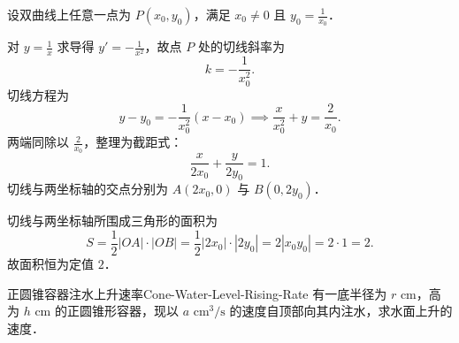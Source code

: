 \begin{myproof}
    设双曲线上任意一点为 $P(x_0, y_0)$，满足 $x_0 \neq 0$ 且 $y_0 = \frac{1}{x_0}$．

    \begin{center}
    \end{center}

    对 $y = \frac{1}{x}$ 求导得 $y' = -\frac{1}{x^2}$，故点 $P$ 处的切线斜率为
    \begin{equation}
        k = -\frac{1}{x_0^2}.
    \end{equation}
    切线方程为
    \begin{equation}
        y - y_0 = -\frac{1}{x_0^2}(x - x_0) \implies \frac{x}{x_0^2} + y = \frac{2}{x_0}.
    \end{equation}
    两端同除以 $\frac{2}{x_0}$，整理为截距式：
    \begin{equation}
        \frac{x}{2x_0} + \frac{y}{2y_0} = 1.
    \end{equation}
    切线与两坐标轴的交点分别为 $A(2x_0, 0)$ 与 $B(0, 2y_0)$．

    切线与两坐标轴所围成三角形的面积为
    \begin{equation}
        S = \frac{1}{2} |OA| \cdot |OB| = \frac{1}{2} |2x_0| \cdot |2y_0| = 2|x_0 y_0| = 2 \cdot 1 = 2.
    \end{equation}
    故面积恒为定值 $2$．
\end{myproof}

\begin{problem}{正圆锥容器注水上升速率}{Cone-Water-Level-Rising-Rate}
    有一底半径为 $r\text{ cm}$，高为 $h\text{ cm}$ 的正圆锥形容器，现以 $a\text{ cm}^3/\text{s}$ 的速度自顶部向其内注水，求水面上升的速度．
\end{problem}

